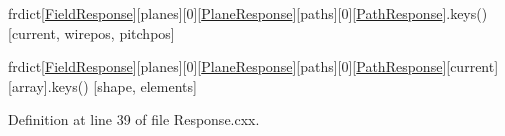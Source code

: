 frdict\mbox{[}\textquotesingle{}\hyperlink{struct_wire_cell_1_1_response_1_1_schema_1_1_field_response}{Field\+Response}\textquotesingle{}\mbox{]}\mbox{[}\textquotesingle{}planes\textquotesingle{}\mbox{]}\mbox{[}0\mbox{]}\mbox{[}\textquotesingle{}\hyperlink{struct_wire_cell_1_1_response_1_1_schema_1_1_plane_response}{Plane\+Response}\textquotesingle{}\mbox{]}\mbox{[}\textquotesingle{}paths\textquotesingle{}\mbox{]}\mbox{[}0\mbox{]}\mbox{[}\textquotesingle{}\hyperlink{struct_wire_cell_1_1_response_1_1_schema_1_1_path_response}{Path\+Response}\textquotesingle{}\mbox{]}.keys() \mbox{[}\textquotesingle{}current\textquotesingle{}, \textquotesingle{}wirepos\textquotesingle{}, \textquotesingle{}pitchpos\textquotesingle{}\mbox{]}

frdict\mbox{[}\textquotesingle{}\hyperlink{struct_wire_cell_1_1_response_1_1_schema_1_1_field_response}{Field\+Response}\textquotesingle{}\mbox{]}\mbox{[}\textquotesingle{}planes\textquotesingle{}\mbox{]}\mbox{[}0\mbox{]}\mbox{[}\textquotesingle{}\hyperlink{struct_wire_cell_1_1_response_1_1_schema_1_1_plane_response}{Plane\+Response}\textquotesingle{}\mbox{]}\mbox{[}\textquotesingle{}paths\textquotesingle{}\mbox{]}\mbox{[}0\mbox{]}\mbox{[}\textquotesingle{}\hyperlink{struct_wire_cell_1_1_response_1_1_schema_1_1_path_response}{Path\+Response}\textquotesingle{}\mbox{]}\mbox{[}\textquotesingle{}current\textquotesingle{}\mbox{]}\mbox{[}\textquotesingle{}array\textquotesingle{}\mbox{]}.keys() \mbox{[}\textquotesingle{}shape\textquotesingle{}, \textquotesingle{}elements\textquotesingle{}\mbox{]} 

Definition at line 39 of file Response.\+cxx.

